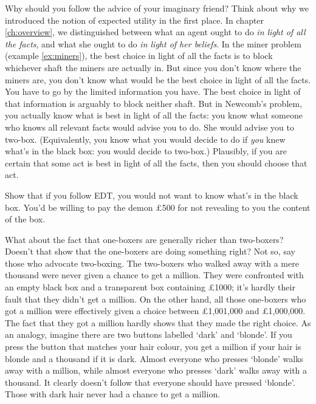 Why should you follow the advice of your imaginary friend? Think about
why we introduced the notion of expected utility in the first place.
In chapter \ref{ch:overview}, we distinguished between what an agent
ought to do \emph{in light of all the facts}, and what she ought to do
\emph{in light of her beliefs}. In the miner problem (example
\ref{ex:miners}), the best choice in light of all the facts is to
block whichever shaft the miners are actually in. But since you don't
know where the miners are, you don't know what would be the best
choice in light of all the facts. You have to go by the limited
information you have. The best choice in light of that information is
arguably to block neither shaft. But in Newcomb's problem, you
actually know what is best in light of all the facts: you know what
someone who knows all relevant facts would advise you to do. She would
advise you to two-box. (Equivalently, you know what you would decide
to do if \emph{you} knew what's in the black box: you would decide to
two-box.) Plausibly, if you are certain that some act is best in light
of all the facts, then you should choose that act.

\begin{exercise}{2}
  Show that if you follow EDT, you would not want to know what's in
  the black box. You'd be willing to pay the demon £500 for not
  revealing to you the content of the box. 
\end{exercise}

What about the fact that one-boxers are generally richer than
two-boxers? Doesn't that show that the one-boxers are doing something
right? Not so, say those who advocate two-boxing. The two-boxers who
walked away with a mere thousand were never given a chance to get a
million. They were confronted with an empty black box and a transparent
box containing £1000; it's hardly their fault that they didn't get a
million. On the other hand, all those one-boxers who got a million
were effectively given a choice between £1,001,000 and £1,000,000. The
fact that they got a million hardly shows that they made the right
choice. As an analogy, imagine there are two buttons labelled `dark'
and `blonde'. If you press the button that matches your hair colour,
you get a million if your hair is blonde and a thousand if it is
dark. Almost everyone who presses `blonde' walks away with a million,
while almost everyone who presses `dark' walks away with a
thousand. It clearly doesn't follow that everyone should have pressed
`blonde'. Those with dark hair never had a chance to get a million.

